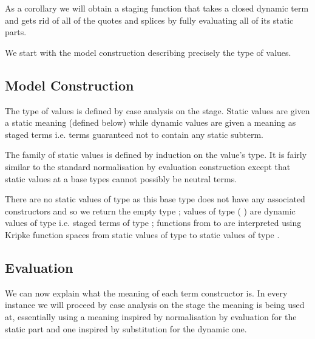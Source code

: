
As a corollary we will obtain a staging function
that takes a closed dynamic term and gets rid of all of
the quotes and splices by fully
evaluating all of its static parts.


We start with the model construction describing precisely
the type of values.

\subsection{Model Construction}\label{sec:stagingmodel}

The type of values is defined by case analysis on the stage.
%
Static values are given a static meaning (defined below)
while dynamic values are given a meaning as staged terms
i.e. terms guaranteed not to contain any static subterm.


The family of static values is defined by induction on
the value's type. It is fairly similar to the standard
normalisation by evaluation construction
except that static values at a base types cannot possibly
be neutral terms.

\begin{AgdaSuppressSpace}
\end{AgdaSuppressSpace}

There are no static values of type  as this base type does
not have any associated constructors and so we return the empty type ;
values of type ( ) are dynamic values of type 
i.e. staged terms of type ;
functions from  to  are interpreted using Kripke function
spaces from static values of type  to static values of type .

\subsection{Evaluation}

We can now explain what the meaning of each term constructor is.
In every instance we will proceed by case analysis on the
stage the meaning is being used at, essentially using a
meaning inspired by normalisation by evaluation for the static
part and one inspired by substitution for the dynamic one.

